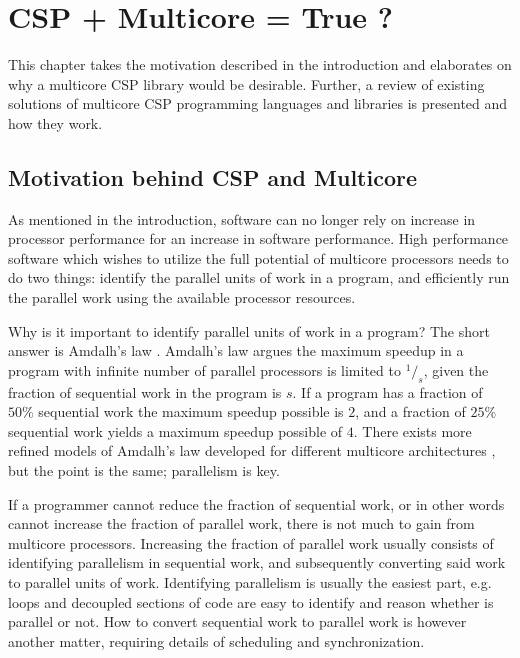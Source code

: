 

\chapter{CSP + Multicore = True ?}
\label{ch:multicore_csp}


This chapter takes the motivation described in the introduction and elaborates on why a multicore CSP library would be desirable. Further, a review of existing solutions of multicore CSP programming languages and libraries is presented and how they work.


\section{Motivation behind CSP and Multicore}
\label{sec:multicore_csp_motivation}


As mentioned in the introduction, software can no longer rely on increase in processor performance for an increase in software performance. High performance software which wishes to utilize the full potential of multicore processors needs to do two things: identify the parallel units of work in a program, and efficiently run the parallel work using the available processor resources. 

Why is it important to identify parallel units of work in a program? The short answer is Amdalh's law \citep{amdahl1967validity}. Amdalh's law argues the maximum speedup in a program with infinite number of parallel processors is limited to $^1/_s$, given the fraction of sequential work in the program is $s$. If a program has a fraction of $50\%$ sequential work the maximum speedup possible is $2$, and a fraction of $25\%$ sequential work yields a maximum speedup possible of $4$. There exists more refined models of Amdalh's law developed for different multicore architectures \citep{sun2010reevaluating}, but the point is the same; parallelism is key.

If a programmer cannot reduce the fraction of sequential work, or in other words cannot increase the fraction of parallel work, there is not much to gain from multicore processors. Increasing the fraction of parallel work usually consists of identifying parallelism in sequential work, and subsequently converting said work to parallel units of work. Identifying parallelism is usually the easiest part, e.g. loops and decoupled sections of code are easy to identify and reason whether is parallel or not. How to convert sequential work to parallel work is however another matter, requiring details of scheduling and synchronization.

